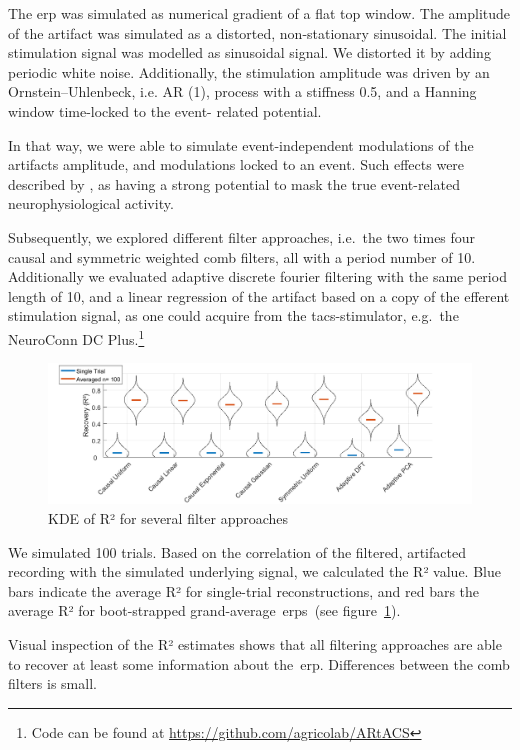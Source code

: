 \documentclass[a4paper]{article}
\newcommand{\figref}[1]{(see figure~\ref{#1})}
\begin{document}
The \gls{erp} was simulated as numerical gradient of a flat top window.
The amplitude of the artifact was simulated as a distorted, non-stationary sinusoidal. The initial stimulation signal was modelled as sinusoidal signal. We distorted it by adding periodic white noise. Additionally, the stimulation amplitude was driven by an Ornstein–Uhlenbeck, i.e. AR (1), process with a stiffness 0.5, and a Hanning window time-locked to the event- related potential.

In that way, we were able to simulate event-independent modulations of the artifacts amplitude, and modulations locked to an event. Such effects were described by \citep{Noury_2016}, as having a strong potential to mask the true event-related neurophysiological activity.

Subsequently, we explored different filter approaches, i.e.\ the two times four causal and symmetric weighted comb filters, all with a period number of 10. Additionally we evaluated adaptive discrete fourier filtering with the same period length of 10, and a linear regression of the artifact based on a copy of the efferent stimulation signal, as one could acquire from the \gls{tacs}-stimulator, e.g.\ the NeuroConn DC Plus.\footnote{Code can be found at \url{https://github.com/agricolab/ARtACS}}

\begin{figure}[hbtp]
    \includegraphics[width=\textwidth]{img/eva/sim_R2.png}
    \caption{KDE of R² for several filter approaches}\label{fig:simR2}
\end{figure}

We simulated 100 trials. Based on  the correlation of the filtered, artifacted recording with the simulated underlying signal, we calculated the R² value. Blue bars indicate the average R² for single-trial reconstructions, and red bars the average R² for boot-strapped grand-average~\gls{erp}s~\figref{fig:simR2}.

Visual inspection of the R² estimates shows that all filtering approaches are able to recover at least some information about the~\gls{erp}. Differences between the comb filters is small.
\end{document}
